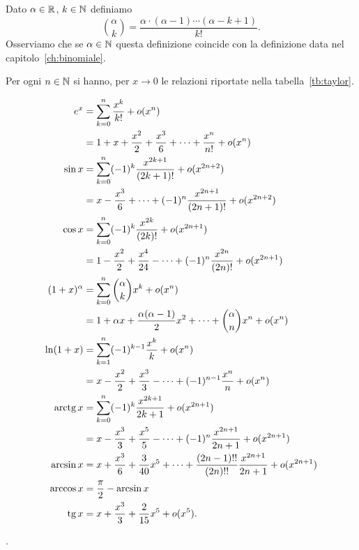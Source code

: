 \begin{definition}
\label{def:binomiale_reale}%
\mymark{***}%
Dato $\alpha \in \mathbb R$, $k \in \mathbb N$ definiamo
\[
 {\alpha \choose k } = \frac{\alpha \cdot (\alpha-1) \cdots (\alpha -k +1)}{k!}.
\]
Osserviamo che se $\alpha \in \mathbb N$ questa definizione coincide
con la definizione data nel capitolo~\ref{ch:binomiale}.
\end{definition}

\begin{theorem}
\label{th:sviluppi_taylor}
\mymark{***}
Per ogni $n\in \mathbb N$ si hanno, per $x\to 0$
le relazioni riportate nella tabella~\ref{tb:taylor}.
\end{theorem}
\begin{table}
\begin{align*}
e^x &= \sum_{k=0}^n \frac{x^k}{k!} + o(x^n) \\
  &= 1 + x + \frac{x^2}{2} + \frac {x^3}{6} + \dots + \frac{x^n}{n!} + o(x^n) \\
\sin x &= \sum_{k=0}^n (-1)^k\frac{x^{2k+1}}{(2k+1)!} + o(x^{2n+2}) \\
 &= x - \frac{x^3}{6} + \dots + (-1)^{n} \frac{x^{2n+1}}{(2n+1)!}  + o(x^{2n+2})\\
 \cos x &= \sum_{k=0}^n (-1)^k \frac{x^{2k}}{(2k)!} + o(x^{2n+1}) \\
   &= 1 - \frac{x^2}{2} + \frac{x^4}{24} - \dots + (-1)^n\frac{x^{2n}}{(2n)!} + o(x^{2n+1})\\
 (1+x)^\alpha &= \sum_{k=0}^n {\alpha \choose k} x^k + o(x^n)\\
    &= 1 + \alpha x + \frac{\alpha (\alpha-1)}{2} x^2 + \dots + {\alpha \choose n} x^n + o(x^n) \\
  \ln (1+x) &= \sum_{k=1}^n (-1)^{k-1} \frac{x^k}{k} + o(x^n) \\
         &= x - \frac{x^2}{2} + \frac{x^3}{3} - \dots + (-1)^{n-1}\frac{x^n}{n} + o(x^n) \\
  \operatorname{arctg} x &= \sum_{k=0}^n (-1)^k \frac{x^{2k+1}}{2k+1} + o(x^{2n+1})\\
    &= x - \frac{x^3}{3} + \frac{x^5}{5} - \dots + (-1)^n \frac{x^{2n+1}}{2n +1} + o(x^{2n+1})\\
  \arcsin x &= x + \frac{x^3}{6} + \frac{3}{40} x^5 + \dots + \frac{(2n-1)!!}{(2n)!!} \frac{x^{2n+1}}{2n+1} + o(x^{2n+1}) \\
  \arccos x &= \frac \pi 2 - \arcsin x\\
  \operatorname{tg} x &= x + \frac{x^3}{3} + \frac{2}{15} x^5 + o(x^5).
\end{align*}
\caption{sviluppi di Taylor, per $x\to 0$, di alcune funzioni elementari.
%
%
Si veda il teorema~\ref{th:sviluppi_taylor}}.
\label{tb:taylor}%
\end{table}
